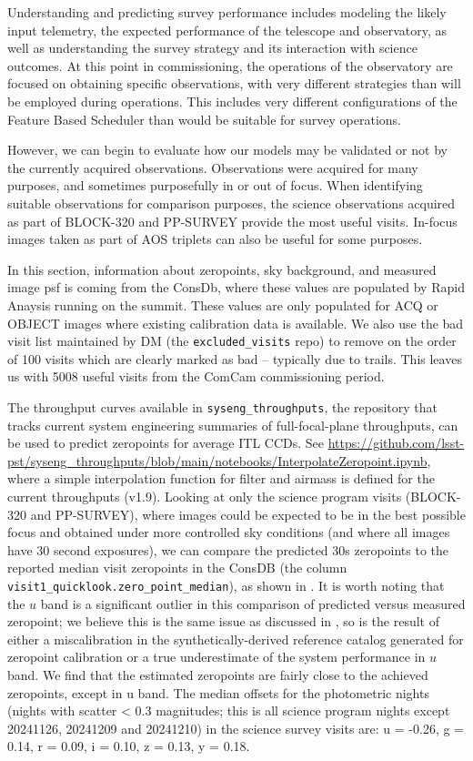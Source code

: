 Understanding and predicting survey performance includes modeling the likely input telemetry, the expected performance of the telescope and observatory, as well as understanding the survey strategy and its interaction with science outcomes. At this point in commissioning, the operations of the observatory are focused on obtaining specific observations, with very different strategies than will be employed during operations. This includes very different configurations of the Feature Based Scheduler than would be suitable for survey operations. 

However, we can begin to evaluate how our models may be validated or not by the currently acquired observations.  Observations were acquired for many purposes, and sometimes purposefully in or out of focus. When identifying suitable observations for comparison purposes, the science observations acquired as part of BLOCK-320  and PP-SURVEY provide the most useful visits. In-focus images taken as part of AOS triplets can also be useful for some purposes. 

In this section, information about zeropoints, sky background, and measured image psf is coming from the ConsDb, where these values are populated by Rapid Anaysis running on the summit. These values are only populated for ACQ or OBJECT images where existing calibration data is available. We also use the bad visit list maintained by DM (the \texttt{excluded\_visits} repo) to remove on the order of 100 visits which are clearly marked as bad -- typically due to trails. This leaves us with 5008 useful visits from the ComCam commissioning period.

The throughput curves available in \texttt{syseng\_throughputs}, the repository that tracks current system engineering summaries of full-focal-plane throughputs, can be used to predict zeropoints for average ITL CCDs. See \url{https://github.com/lsst-pst/syseng\_throughputs/blob/main/notebooks/InterpolateZeropoint.ipynb}, where a simple interpolation function for filter and airmass is defined for the current throughputs (v1.9).  Looking at only the science program visits (BLOCK-320 and PP-SURVEY), where images could be expected to be in the best possible focus and obtained under more controlled sky conditions (and where all images have 30 second exposures), we can compare the predicted 30s zeropoints to the reported median visit zeropoints in the ConsDB (the column \texttt{visit1\_quicklook.zero\_point\_median}), as shown in . It is worth noting that the $u$ band is a significant outlier in this comparison of predicted versus measured zeropoint; we believe this is the same issue as discussed in , so is the result of either a miscalibration in the synthetically-derived reference catalog generated for zeropoint calibration or a true underestimate of the system performance in $u$ band.  We find that the estimated zeropoints are fairly close to the achieved zeropoints, except in u band. The median offsets for the photometric nights (nights with scatter < 0.3 magnitudes; this is all science program nights except 20241126, 20241209 and 20241210) in the science survey visits are:  u = -0.26, g = 0.14, r = 0.09, i = 0.10, z = 0.13, y = 0.18. 

